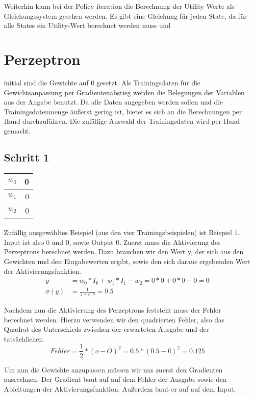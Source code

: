 \documentclass[a4paper]{article}
\begin{document}
Weiterhin kann bei der Policy iteration die Berechnung der Utility Werte als Gleichungssystem gesehen werden. Es gibt eine Gleichung für jeden State, da für alle States ein Utility-Wert berechnet werden muss und


\section{Perzeptron}
initial sind die Gewichte auf 0 gesetzt. Als Trainingsdaten für die Gewichtsanpassung per Gradientenabstieg werden die Belegungen der Variablen aus der Angabe benutzt. Da alle Daten angegeben werden sollen und die Trainingsdatenmenge äußerst gering ist, bietet es sich an die Berechnungen per Hand durchzuführen. Die zufällige Auswahl der Trainingsdaten wird per Hand gemacht.

\subsection{Schritt 1}
\begin{tabular}{|l|r|}
	\hline
	$w_0$ & 0 \\\hline
	$w_1$ & 0 \\\hline
	$w_2$ & 0 \\\hline
\end{tabular}
\paragraph{}
Zufällig ausgewähltes Beispiel (aus den vier Trainingsbeispielen) ist Beispiel 1. Input ist also 0 und 0, sowie Output 0.
Zuerst muss die Aktivierung des Perzeptrons berechnet werden. Dazu brauchen wir den Wert y, der sich aus den Gewichten und den Eingabewerten ergibt, sowie den sich daraus ergebenden Wert der Aktivierungsfunktion.
\begin{align*}
	y &= w_0 * I_0 + w_1 * I_1 - w_2 = 0 * 0 + 0 * 0 - 0 = 0 \\
	\sigma(y) &= \frac{1}{1 + e^{-y}} = 0.5
\end{align*}

Nachdem nun die Aktivierung des Perzeptrons feststeht muss der Fehler berechnet werden. Hierzu verwenden wir den quadrierten Fehler, also das Quadrat des Unterschieds zwischen der erwarteten Ausgabe und der tatsächlichen.
\[
	Fehler = \frac{1}{2} * (o - O)^2 = 0.5 * (0.5 - 0)^2 = 0.125
\]

Um nun die Gewichte anzupassen müssen wir uns zuerst den Gradienten ausrechnen.
Der Gradient baut auf auf dem Fehler der Ausgabe sowie den Ableitungen der Aktivierungsfunktion. Außerdem baut er auf auf dem Input.
\end{document}
